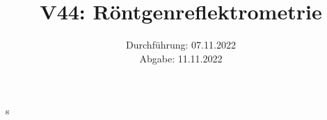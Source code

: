 



\title{V44: Röntgenreflektrometrie}

\date{Durchführung: 07.11.2022\\
      Abgabe: 11.11.2022}



\maketitle
\thispagestyle{empty}

\newpage
s



% 
%



\newpage 
\printbibliography{}










%
%
%




%
